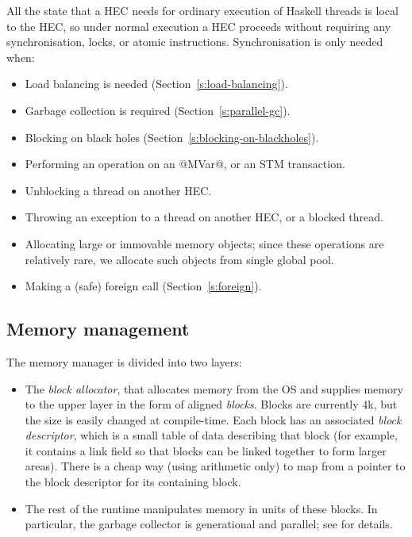 \documentclass[twocolumn,9pt]{sigplanconf}
\newcommand{\sdm}[1]{{{\bf SDM:} \sl #1}}
\begin{document}
All the state that a HEC needs for ordinary execution of Haskell
threads is local to the HEC, so under normal execution a HEC proceeds
without requiring any synchronisation, locks, or atomic instructions.
Synchronisation is only needed when:

\begin{itemize}
\item Load balancing is needed (Section~\ref{s:load-balancing}).
\item Garbage collection is required (Section~\ref{s:parallel-gc}).
\item Blocking on black holes (Section~\ref{s:blocking-on-blackholes}).
\item Performing an operation on an @MVar@, or an STM transaction.
\item Unblocking a thread on another HEC.
\item Throwing an exception to a thread on another HEC, or a blocked thread.
\item Allocating large or immovable memory objects; since these operations
are relatively rare, we allocate such objects from single global pool.
\item Making a (safe) foreign call (Section~\ref{s:foreign}).
\end{itemize}


\subsection{Memory management} \label{s:memory-mgt}

The memory manager is divided into two layers:

\begin{itemize}
\item The \emph{block allocator}, that allocates memory from the OS
  and supplies memory to the upper layer in the form of aligned
  \emph{blocks}.  Blocks are currently 4k, but the size is easily
  changed at compile-time.  Each block has an associated \emph{block
    descriptor}, which is a small table of data describing that block
  (for example, it contains a link field so that blocks can be linked
  together to form larger areas).  There is a cheap way (using
  arithmetic only) to map from a pointer to the block descriptor for
  its containing block.

\item The rest of the runtime manipulates memory in units of these
  blocks.  In particular, the garbage collector is generational and
  parallel; see \cite{parallel-gc-08} for details.
\end{itemize}
\end{document}
